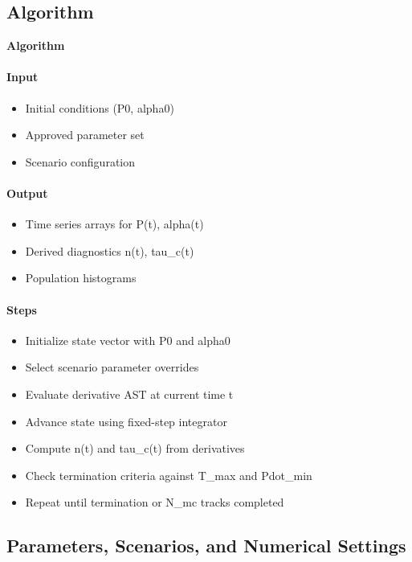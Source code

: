 \documentclass[11pt]{article}
\begin{document}
\subsection{Algorithm}

\noindent\textbf{Algorithm}
\paragraph{Input}
\begin{itemize}\raggedright
\item Initial conditions (P0, alpha0)
\item Approved parameter set
\item Scenario configuration
\end{itemize}
\paragraph{Output}
\begin{itemize}\raggedright
\item Time series arrays for P(t), alpha(t)
\item Derived diagnostics n(t), tau\_\allowbreak{}c(t)
\item Population histograms
\end{itemize}
\paragraph{Steps}
\begin{itemize}\raggedright
\item Initialize state vector with P0 and alpha0
\item Select scenario parameter overrides
\item Evaluate derivative AST at current time t
\item Advance state using fixed-step integrator
\item Compute n(t) and tau\_\allowbreak{}c(t) from derivatives
\item Check termination criteria against T\_\allowbreak{}max and Pdot\_\allowbreak{}min
\item Repeat until termination or N\_\allowbreak{}mc tracks completed
\end{itemize}

\subsection{Parameters, Scenarios, and Numerical Settings}
\end{document}
